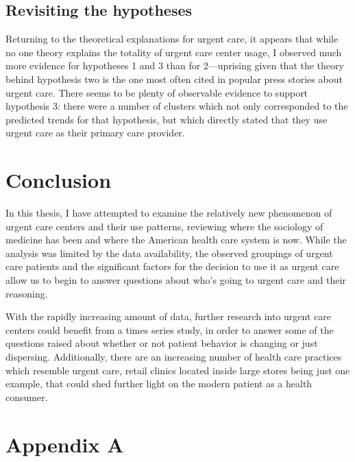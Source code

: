 \documentclass[12pt,twoside]{reedthesis}
\begin{document}
  \section*{Revisiting the hypotheses}\label{revisiting-the-hypotheses}
  
  \doublespacing
  Returning to the theoretical explanations for urgent care, it appears
  that while no one theory explains the totality of urgent care center
  usage, I observed much more evidence for hypotheses 1 and 3 than for
  2---uprising given that the theory behind hypothesis two is the one most
  often cited in popular press stories about urgent care. There seems to
  be plenty of observable evidence to support hypothesis 3: there were a
  number of clusters which not only corresponded to the predicted trends
  for that hypothesis, but which directly stated that they use urgent care
  as their primary care provider.
  
  \chapter*{Conclusion}\label{conclusion}
  
  \setcounter{chapter}{6} \setcounter{section}{0} \onehalfspacing
  
  In this thesis, I have attempted to examine the relatively new
  phenomenon of urgent care centers and their use patterns, reviewing
  where the sociology of medicine has been and where the American health
  care system is now. While the analysis was limited by the data
  availability, the observed groupings of urgent care patients and the
  significant factors for the decision to use it as urgent care allow us
  to begin to answer questions about who's going to urgent care and their
  reasoning.
  
  With the rapidly increasing amount of data, further research into urgent
  care centers could benefit from a times series study, in order to answer
  some of the questions raised about whether or not patient behavior is
  changing or just dispersing. Additionally, there are an increasing
  number of health care practices which resemble urgent care, retail
  clinics located inside large stores being just one example, that could
  shed further light on the modern patient as a health consumer.
  
  \chapter*{Appendix A}\label{appendix-a}
  
\end{document}
